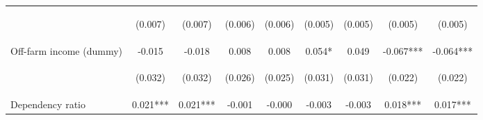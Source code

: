 \begin{center}
\begin{tabular}{lcccccccc}
\vspace{4pt} & \begin{footnotesize}(0.007)\end{footnotesize} & \begin{footnotesize}(0.007)\end{footnotesize} & \begin{footnotesize}(0.006)\end{footnotesize} & \begin{footnotesize}(0.006)\end{footnotesize} & \begin{footnotesize}(0.005)\end{footnotesize} & \begin{footnotesize}(0.005)\end{footnotesize} & \begin{footnotesize}(0.005)\end{footnotesize} & \begin{footnotesize}(0.005)\end{footnotesize} \\
Off-farm income (dummy) & -0.015 & -0.018 & 0.008 & 0.008 & 0.054* & 0.049 & -0.067*** & -0.064*** \\
\vspace{4pt} & \begin{footnotesize}(0.032)\end{footnotesize} & \begin{footnotesize}(0.032)\end{footnotesize} & \begin{footnotesize}(0.026)\end{footnotesize} & \begin{footnotesize}(0.025)\end{footnotesize} & \begin{footnotesize}(0.031)\end{footnotesize} & \begin{footnotesize}(0.031)\end{footnotesize} & \begin{footnotesize}(0.022)\end{footnotesize} & \begin{footnotesize}(0.022)\end{footnotesize} \\
Dependency ratio & 0.021*** & 0.021*** & -0.001 & -0.000 & -0.003 & -0.003 & 0.018*** & 0.017*** \\

\end{tabular}
\end{center}
